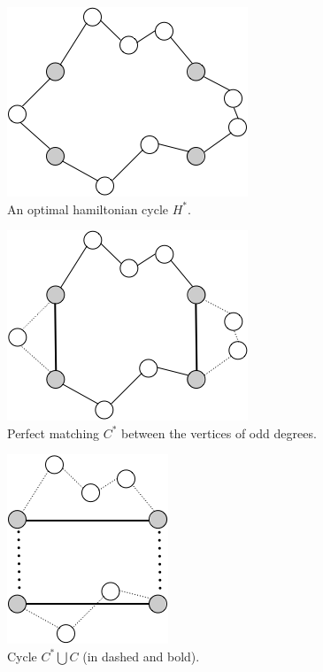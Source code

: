 \begin{figure}[h]
\begin{center}
       \includegraphics[scale=0.7]{FiguresGraph/perfectmatching1}
       \caption{An optimal hamiltonian cycle $H^*$.}
              \label{fig:perfectMatchingInitial}
\end{center}
\end{figure}

\begin{figure}[h]
\begin{center}
       \includegraphics[scale=0.7]{FiguresGraph/perfectmatching2}
       \caption{Perfect matching $C^*$ between the vertices of odd degrees.}
              \label{fig:perfectMatchingC*}
\end{center}
\end{figure}

\begin{figure}[h]
\begin{center}
       \includegraphics[scale=0.7]{FiguresGraph/perfectmatching3}
       \caption{Cycle $C^* \bigcup C$ (in dashed and bold).}
              \label{fig:perfectMatchingC}
\end{center}
\end{figure}

